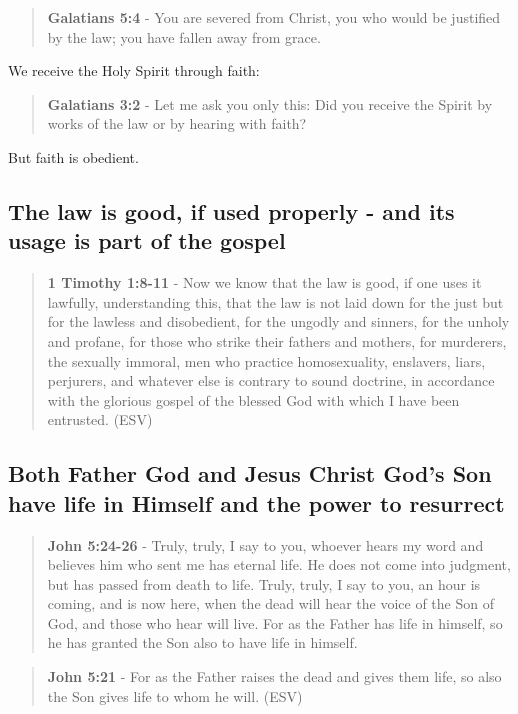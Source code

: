 \documentclass[11pt]{article}
\begin{document}
\begin{quote}
\textbf{Galatians 5:4} - You are severed from Christ, you who would be justified by the law; you have fallen away from grace.
\end{quote}

We receive the Holy Spirit through faith:

\begin{quote}
\textbf{Galatians 3:2} - Let me ask you only this: Did you receive the Spirit by works of the law or by hearing with faith?􄌹
\end{quote}

But faith is obedient.

\subsection{The law is good, if used properly - and its usage is part of the gospel}
\label{sec:org9ead4ea}
\begin{quote}
\textbf{1 Timothy 1:8-11} - Now we know that the law is good, if one uses it lawfully, understanding this, that the law is not laid down for the just but for the lawless and disobedient, for the ungodly and sinners, for the unholy and profane, for those who strike their fathers and mothers, for murderers, the sexually immoral, men who practice homosexuality, enslavers, liars, perjurers, and whatever else is contrary to sound doctrine, in accordance with the glorious gospel of the blessed God with which I have been entrusted. (ESV)
\end{quote}

\subsection{Both Father God and Jesus Christ God's Son have life in Himself and the power to resurrect}
\label{sec:orgb54c501}
\begin{quote}
\textbf{John 5:24-26} - Truly, truly, I say to you, whoever hears my word and believes him who sent me has eternal life. He does not come into judgment, but has passed from death to life. Truly, truly, I say to you, an hour is coming, and is now here, when the dead will hear the voice of the Son of God, and those who hear will live. For as the Father has life in himself, so he has granted the Son also to have life in himself.
\end{quote}

\begin{quote}
\textbf{John 5:21} - For as the Father raises the dead and gives them life, so also the Son gives life to whom he will. (ESV)
\end{quote}
\end{document}

